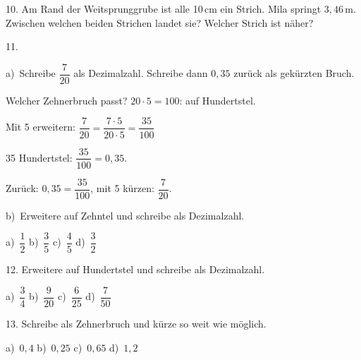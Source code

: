 \documentclass[11pt]{article}
\newcommand{\grau}[1]{{\color{mbgrau}#1}}
\begin{document}
\begin{pfaufg}{}{10.}{}
Am Rand der Weitsprunggrube ist alle 10\,cm ein Strich. Mila springt $3{,}46$\,m. Zwischen welchen beiden Strichen landet sie? Welcher Strich ist näher?
\end{pfaufg}

\begin{pfaufg}{}{11.}{}
\grau{a)\ Schreibe $\dfrac{7}{20}$ als Dezimalzahl. Schreibe dann $0{,}35$ zurück als gekürzten Bruch.\par\smallskip Welcher Zehnerbruch passt? $20 \cdot 5 = 100$: auf Hundertstel.\par Mit 5 erweitern: $\dfrac{7}{20} = \dfrac{7 \cdot 5}{20 \cdot 5} = \dfrac{35}{100}$\par 35 Hundertstel: $\dfrac{35}{100} = 0{,}35$.\par Zurück: $0{,}35 = \dfrac{35}{100}$, mit 5 kürzen: $\dfrac{7}{20}$.}
\par\medskip
b)\ Erweitere auf Zehntel und schreibe als Dezimalzahl. \par\vspace{3pt} a)~$\dfrac{1}{2}$ \qquad b)~$\dfrac{3}{5}$ \qquad c)~$\dfrac{4}{5}$ \qquad d)~$\dfrac{3}{2}$
\end{pfaufg}

\begin{pfaufg}{}{12.}{}
Erweitere auf Hundertstel und schreibe als Dezimalzahl. \par\vspace{3pt} a)~$\dfrac{3}{4}$ \qquad b)~$\dfrac{9}{20}$ \qquad c)~$\dfrac{6}{25}$ \qquad d)~$\dfrac{7}{50}$
\end{pfaufg}

\begin{pfaufg}{}{13.}{}
Schreibe als Zehnerbruch und kürze so weit wie möglich. \par\vspace{3pt} a)~$0{,}4$ \qquad b)~$0{,}25$ \qquad c)~$0{,}65$ \qquad d)~$1{,}2$
\end{pfaufg}
\end{document}
